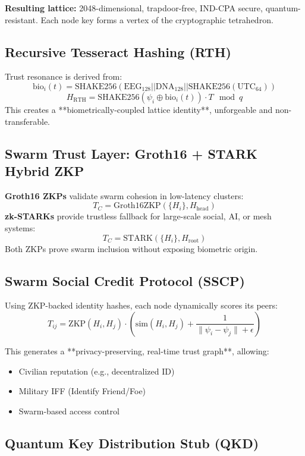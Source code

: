 \documentclass{article}
\begin{document}
\textbf{Resulting lattice:} 2048-dimensional, trapdoor-free, IND-CPA secure, quantum-resistant. Each node key forms a vertex of the cryptographic tetrahedron.

\subsection*{Recursive Tesseract Hashing (RTH)}

Trust resonance is derived from:
\[
\text{bio}_i(t) = \text{SHAKE256}(\text{EEG}_{128} || \text{DNA}_{128} || \text{SHAKE256}(\text{UTC}_{64}))
\]
\[
H_{\text{RTH}} = \text{SHAKE256}(\psi_i \oplus \text{bio}_i(t)) \cdot T \mod q
\]
This creates a **biometrically-coupled lattice identity**, unforgeable and non-transferable.

\subsection*{Swarm Trust Layer: Groth16 + STARK Hybrid ZKP}

\textbf{Groth16 ZKPs} validate swarm cohesion in low-latency clusters:
\[
T_C = \text{Groth16ZKP}(\{H_i\}, H_{\text{head}})
\]
\textbf{zk-STARKs} provide trustless fallback for large-scale social, AI, or mesh systems:
\[
T_C = \text{STARK}(\{H_i\}, H_{\text{root}})
\]
Both ZKPs prove swarm inclusion without exposing biometric origin.

\subsection*{Swarm Social Credit Protocol (SSCP)}

Using ZKP-backed identity hashes, each node dynamically scores its peers:
\[
T_{ij} = \text{ZKP}(H_i, H_j) \cdot \left( \text{sim}(H_i, H_j) + \frac{1}{\|\psi_i - \psi_j\| + \epsilon} \right)
\]

This generates a **privacy-preserving, real-time trust graph**, allowing:
\begin{itemize}
    \item Civilian reputation (e.g., decentralized ID)
    \item Military IFF (Identify Friend/Foe)
    \item Swarm-based access control
\end{itemize}

\subsection*{Quantum Key Distribution Stub (QKD)}
\end{document}
